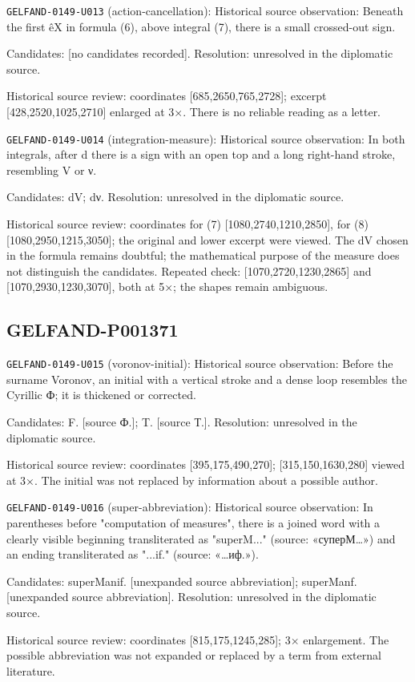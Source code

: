 \noindent\texttt{GELFAND-0149-U013} (action-cancellation): Historical source observation: Beneath the first êX in formula (6), above integral (7), there is a small crossed-out sign.\par
Candidates: [no candidates recorded]. Resolution: unresolved in the diplomatic source.\par
Historical source review: coordinates [685,2650,765,2728]; excerpt [428,2520,1025,2710] enlarged at 3×. There is no reliable reading as a letter.\par

\noindent\texttt{GELFAND-0149-U014} (integration-measure): Historical source observation: In both integrals, after d there is a sign with an open top and a long right-hand stroke, resembling V or ν.\par
Candidates: dV; dν. Resolution: unresolved in the diplomatic source.\par
Historical source review: coordinates for (7) [1080,2740,1210,2850], for (8) [1080,2950,1215,3050]; the original and lower excerpt were viewed. The dV chosen in the formula remains doubtful; the mathematical purpose of the measure does not distinguish the candidates. Repeated check: [1070,2720,1230,2865] and [1070,2930,1230,3070], both at 5×; the shapes remain ambiguous.\par

\subsection*{GELFAND-P001371}
\noindent\texttt{GELFAND-0149-U015} (voronov-initial): Historical source observation: Before the surname Voronov, an initial with a vertical stroke and a dense loop resembles the Cyrillic Ф; it is thickened or corrected.\par
Candidates: F. [source Ф.]; T. [source Т.]. Resolution: unresolved in the diplomatic source.\par
Historical source review: coordinates [395,175,490,270]; [315,150,1630,280] viewed at 3×. The initial was not replaced by information about a possible author.\par

\noindent\texttt{GELFAND-0149-U016} (super-abbreviation): Historical source observation: In parentheses before "computation of measures", there is a joined word with a clearly visible beginning transliterated as "superM..." (source: «суперМ…») and an ending transliterated as "...if." (source: «…иф.»).\par
Candidates: superManif. [unexpanded source abbreviation]; superManf. [unexpanded source abbreviation]. Resolution: unresolved in the diplomatic source.\par
Historical source review: coordinates [815,175,1245,285]; 3× enlargement. The possible abbreviation was not expanded or replaced by a term from external literature.\par

